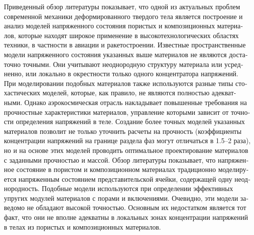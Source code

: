 \begin{russian}
Приведенный обзор литературы показывает, что одной из актуальных проблем современной механики деформированного твердого тела является построение и анализ моделей напряженного состояния пористых и композиционных материалов, которые находят широкое применение в высокотехнологических областях техники, в частности в авиации и ракетостроении. Известные пространственные модели напряженного состояния указанных выше материалов не являются достаточно точными. Они учитывают неоднородную структуру материала или усредненно, или локально в окрестности только одного концентратора напряжений. При моделировании подобных материалов также используются разные типы стохастических моделей, которые, как правило, не являются полностью адекватными. Однако аэрокосмическая отрасль накладывает повышенные требования на прочностные характеристики материалов, управление которыми зависит от точности определения напряжений в теле. Создание более точных моделей указанных материалов позволит не только уточнить расчеты на прочность (коэффициенты концентрации напряжений на границе раздела фаз могут отличаться в 1.5--2 раза), но и на основе этих моделей проводить оптимальное проектирование материалов с заданными прочностью и массой. Обзор литературы показывает, что напряженное состояние в пористом и композиционном материалах традиционно моделируется напряженным состоянием представительской ячейки, содержащей одну неоднородность. Подобные модели используются при определении эффективных упругих модулей материалов с порами и включениями. Очевидно, эти модели заведомо не обладают высокой точностью. Основным их недостатком является тот факт, что они не вполне адекватны в локальных зонах концентрации напряжений в телах из пористых и композиционных материалов.


\end{russian}
